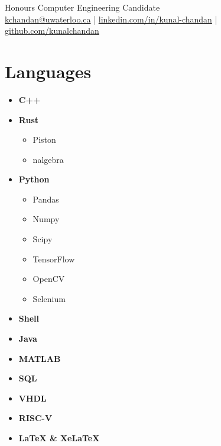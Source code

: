 \documentclass[]{chandan-cv}
\begin{document}
%
%

%
%
{
	Honours Computer Engineering Candidate \\
	\href{mailto:kchandan@uwaterloo.ca}{kchandan@uwaterloo.ca} \qquad
	| \qquad
	\href{https://www.linkedin.com/in/kunal-chandan/}{linkedin.com/in/kunal-chandan} \qquad
	| \qquad
	\href{http://github.com/kunalchandan}{github.com/kunalchandan}
}

%
%

\begin{minipage}[t]{0.23\textwidth}


\section{Languages}
	\begin{itemize}
		\setlength\itemsep{-0.2em}
		\item \textbf{C++}
		\item \textbf{Rust}
				\begin{itemize}
						\setlength\itemsep{-0.17em}
						\item Piston
						\item nalgebra
				\end{itemize}
		\item \textbf{Python}
			\begin{itemize}
				\setlength\itemsep{-0.17em}
				\item Pandas
				\item Numpy
				\item Scipy
				\item TensorFlow
				\item OpenCV
				\item Selenium
			\end{itemize}
		\item \textbf{Shell}
		\item \textbf{Java}
		\item \textbf{MATLAB}
		\item \textbf{SQL}
		\item \textbf{VHDL}
		\item \textbf{RISC-V}
		\item \textbf{LaTeX \& XeLaTeX}
	\end{itemize}


\end{minipage}
\end{document}
